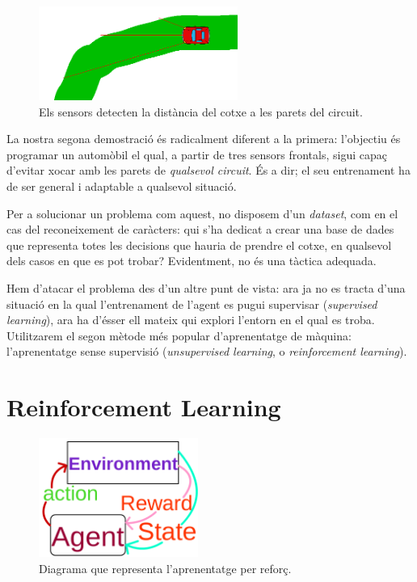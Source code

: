\begin{figure}[ht!]
\centering
\includegraphics[width=65mm]{data/car1.png}
\caption{Els sensors detecten la distància del cotxe a les parets del circuit.}
\label{sensors}
\end{figure}

La nostra segona demostració és radicalment diferent a la primera:
l'objectiu és programar un automòbil el qual, a partir de tres sensors frontals,
sigui capaç d'evitar xocar amb les parets de \emph{qualsevol circuit}.
És a dir; el seu entrenament ha de ser general i adaptable a qualsevol situació.

Per a solucionar un problema com aquest, no disposem d'un \emph{dataset},
com en el cas del reconeixement de caràcters: qui s'ha dedicat a crear
una base de dades que representa totes les decisions que hauria de prendre
el cotxe, en qualsevol dels casos en que es pot trobar? Evidentment, no és
una tàctica adequada.

Hem d'atacar el problema des d'un altre punt de vista: ara ja no es tracta
d'una situació en la qual l'entrenament de l'agent es pugui supervisar
(\emph{supervised learning}), ara ha d'ésser ell mateix qui explori l'entorn
en el qual es troba. Utilitzarem el segon mètode més popular d'aprenentatge
de màquina: l'aprenentatge sense supervisió (\emph{unsupervised learning}, o \emph{reinforcement learning}).
\\

\section{Reinforcement Learning}

\begin{figure}[ht!]
\centering
\includegraphics[width=52mm]{data/reinforce.png}
\caption{Diagrama que representa l'aprenentatge per reforç.}
\label{reinforcegraph}
\end{figure}

